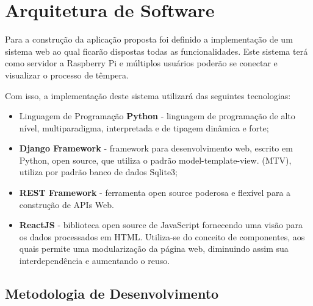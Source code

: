 \section{Arquitetura de Software}

Para a construção da aplicação proposta foi definido a implementação de um sistema web ao qual ficarão dispostas todas as funcionalidades. Este sistema terá como servidor a Raspberry Pi e múltiplos usuários poderão se conectar e visualizar o processo de têmpera.

Com isso, a implementação deste sistema utilizará das seguintes tecnologias:
\begin{itemize}
	\item Linguagem de Programação \textbf{Python} - linguagem de programação de alto nível, multiparadigma, interpretada e de tipagem dinâmica e forte;
	\item \textbf{Django Framework} - framework para desenvolvimento web, escrito em Python, open source, que utiliza o padrão model-template-view. (MTV), utiliza por padrão banco de dados Sqlite3;
	\item \textbf{REST Framework} -  ferramenta open source poderosa e flexível para a construção de APIs Web.
	\item \textbf{ReactJS} - biblioteca open source de JavaScript fornecendo uma visão para os dados processados em HTML. Utiliza-se do conceito de componentes, aos quais permite uma modularização da página web, diminuindo assim sua interdependência e aumentando o reuso.
	
\end{itemize}

\subsection{Metodologia de Desenvolvimento}


